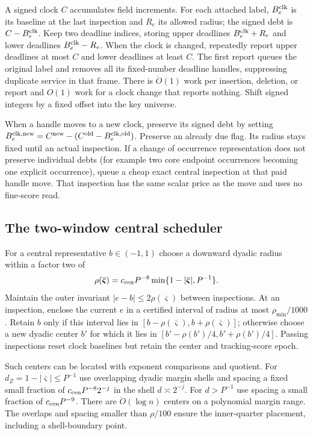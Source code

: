 \documentclass[11pt]{article}
\theoremstyle{remark}
\newcommand{\vvsbar}{\overline{\boldsymbol{\varsigma}}}
\renewcommand{\O}{\ddot{O}}
\begin{document}
A signed clock $C$ accumulates field increments.
For each attached label, $B_e^{\rm clk}$ is its baseline at the last inspection
and $R_e$ its allowed radius; the signed debt is $C-B_e^{\rm clk}$.
Keep two deadline indices, storing upper deadlines $B_e^{\rm clk}+R_e$ and lower
deadlines $B_e^{\rm clk}-R_e$.
When the clock is changed, repeatedly report upper deadlines at most $C$ and
lower deadlines at least $C$.
The first report queues the original label and removes all its fixed-number
deadline handles, suppressing duplicate service in that frame.
There is $\O(1)$ work per insertion, deletion, or report and $O(1)$ work for a
clock change that reports nothing.
Shift signed integers by a fixed offset into the key universe.

When a handle moves to a new clock, preserve its signed debt by setting
$B_e^{\rm clk,new}=C^{\rm new}-(C^{\rm old}-B_e^{\rm clk,old})$.
Preserve an already due flag.
Its radius stays fixed until an actual inspection.
If a change of occurrence representation does not preserve individual debts (for
example two core endpoint occurrences becoming one explicit occurrence), queue a
cheap exact central inspection at that paid handle move.
That inspection has the same scalar price as the move and uses no fine-score
read.

\subsection{The two-window central scheduler}

For a central representative $b\in(-1,1)$ choose a downward dyadic radius within
a factor two of
\[
 \rho(\vvsbar)=c_{\rm cen}P^{-8}\min\{1-|\vvsbar|,P^{-1}\}.
\]
Maintain the outer invariant $|e-b|\le2\rho(\vvsbar)$ between inspections.
At an inspection, enclose the current $e$ in a certified interval of radius at
most $\rho_{\min}/1000$.
Retain $b$ only if this interval lies in $[b-\rho(\vvsbar),b+\rho(\vvsbar)]$; otherwise
choose a new dyadic center $b'$ for which it lies in
$[b'-\rho(b')/4,b'+\rho(b')/4]$.
Passing inspections reset clock baselines but retain the center and
tracking-score epoch.

Such centers can be located with exponent comparisons and quotient.
For $d_Z=1-|\vvsbar|\le P^{-1}$ use overlapping dyadic margin shells and spacing a fixed
small fraction of $c_{\rm cen}P^{-8}2^{-j}$ in the shell $d\asymp2^{-j}$.
For $d>P^{-1}$ use spacing a small fraction of $c_{\rm cen}P^{-9}$.
There are $\O(\log n)$ centers on a polynomial margin range.
The overlaps and spacing smaller than $\rho/100$ ensure the inner-quarter
placement, including a shell-boundary point.
\end{document}
